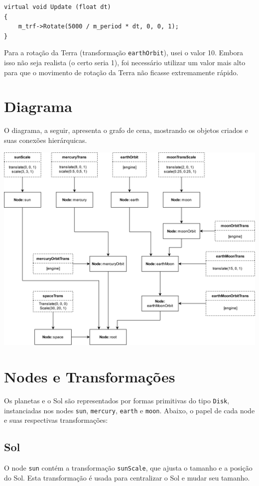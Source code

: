 \documentclass[11pt, a4paper]{article}
\begin{document}
\begin{verbatim}
virtual void Update (float dt)
{
    m_trf->Rotate(5000 / m_period * dt, 0, 0, 1);
}
\end{verbatim}

Para a rotação da Terra (transformação \texttt{earthOrbit}), usei o valor 10. 
Embora isso não seja realista (o certo seria 1), foi necessário utilizar um 
valor mais alto para que o movimento de rotação da Terra não ficasse extremamente 
rápido.

\section {Diagrama}

O diagrama, a seguir, apresenta o grafo de cena, mostrando os objetos criados e 
suas conexões hierárquicas.

\includegraphics[width=0.8\linewidth]{Trab1Graph.png}

\section {Nodes e Transformações}

Os planetas e o Sol são representados por formas primitivas do tipo 
\texttt{Disk}, instanciadas nos nodes \texttt{sun}, \texttt{mercury}, 
\texttt{earth} e \texttt{moon}. Abaixo, o papel de cada node e suas 
respectivas transformações:

\subsection{Sol}
O node \texttt{sun} contém a transformação \texttt{sunScale}, que ajusta o 
tamanho e a posição do Sol. Esta transformação é usada para centralizar o Sol e 
mudar seu tamanho.
\end{document}
